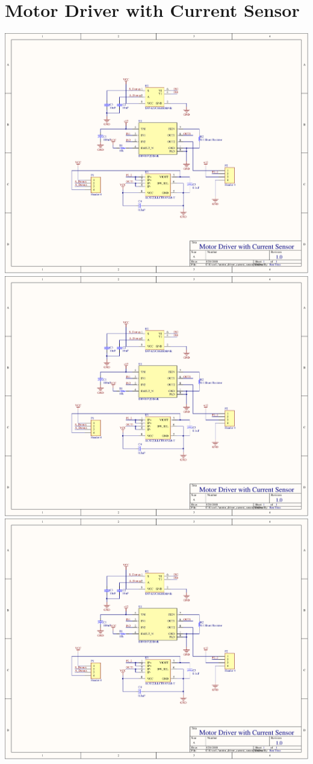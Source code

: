 \section{Motor Driver with Current Sensor}
\label{app:motor_driver_current}
\centering
\includegraphics[page=1,width=\textwidth,angle=270]{PDFs/motor_driver_with_current_sensor.PDF} \newpage
\includegraphics[page=2,width=\textwidth,angle=270]{PDFs/motor_driver_with_current_sensor.PDF} \newpage
\includegraphics[page=3,width=\textwidth,angle=270]{PDFs/motor_driver_with_current_sensor.PDF} \newpage